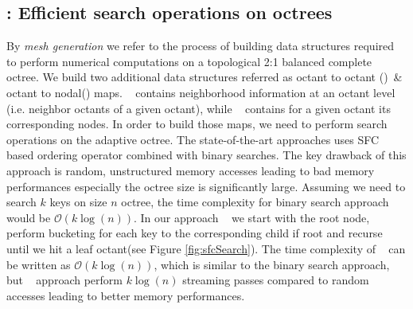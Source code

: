 \documentclass[10pt, conference]{IEEEtran} %
\begin{document}
\subsection{\tsearch: Efficient search operations on octrees}
By \emph{mesh generation} we refer to the process of building data structures required to perform numerical computations on a topological 2:1 balanced complete octree. 
We build two additional data structures referred as octant to octant (\oTo)~\& octant to nodal(\oTn) maps. \oTo~ contains neighborhood information at an octant level (i.e. neighbor octants of a given octant), while \oTn~ contains for a given octant its corresponding nodes. In order to build those maps, we need to perform search operations on the adaptive octree. The state-of-the-art approaches \cite{mantle} uses SFC based ordering operator combined with binary searches. The key drawback of this approach is random, unstructured memory accesses leading to bad memory performances especially the octree size is significantly large. Assuming we need to search $k$ keys on size $n$ octree, the time complexity for binary search approach would be $\mathcal{O}(k\log(n))$. In our approach \tsearch~ we start with the root node, perform bucketing for each key to the corresponding child if root and recurse until we hit a leaf octant(see Figure \ref{fig:sfcSearch}). The time complexity of \tsearch~ can be written as $\mathcal{O}(k\log(n))$, which is similar to the binary search approach, but \tsearch~ approach perform $k\log(n)$ streaming passes compared to random accesses leading to better memory performances. 
	
\end{document}
